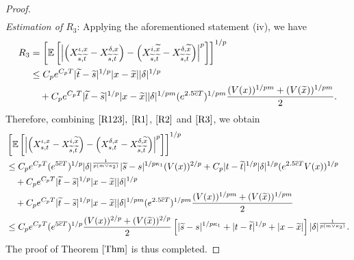 \documentclass[11pt]{article}
\theoremstyle{theorem}
\theoremstyle{definition}
\newcommand{\1}{{\bf 1}}
\begin{document}
\begin{proof}
\begin{align}
\label{R2}
\end{align}
{\it Estimation of $R_3$}: Applying the aforementioned statement (iv), we have
\begin{align}
R_3 & = \left[\mathbb{E}\left[\left| \left(X^{\iota, x}_{\widetilde{s},\widetilde{t}}-X^{\delta, x}_{\widetilde{s},\widetilde{t}}\right) - \left(X^{i, \widetilde{x}}_{\widetilde{s},\widetilde{t}}-X^{\delta, \widetilde{x}}_{\widetilde{s},\widetilde{t}}\right) \right| ^p\right]\right]^{1/p} \notag\\
& \leq C_p e^{C_p T} |\widetilde{t} -\widetilde{s}|^{1/p}|x-\widetilde{x}| |\delta|^{1/p} \notag\\
& \quad + C_p e^{C_p T} |\widetilde{t}-\widetilde{s}|^{1/p}|x-\widetilde{x}|  |\delta|^{1/pm} (e^{2.5 \overline{c}T})^{1/pm}         \frac{(V(x))^{1/pm}+(V(\widetilde{x}))^{1/pm}}{2}. 
\label{R3}
\end{align}
Therefore, combining $\eqref{R123},$ $\eqref{R1}$, $\eqref{R2}$ and $\eqref{R3}$, we obtain  
\begin{align*}
&\left[\mathbb{E}\left[\left|\left(X^{\iota, x}_{s,t}-X^{i,\widetilde{x}}_{\widetilde{s},\widetilde{t}}\right) - \left(X^{\delta, x}_{s,t}-X^{\delta, \widetilde{x}}_{\widetilde{s},\widetilde{t}}\right)\right|^p\right]\right]^{1/p} \notag\\
& \leq C_p e^{C_p T}  (e^{5\overline{c}T})^{1/p}|\delta|^{\frac{1}{p(m \vee \kappa_2)}} |\widetilde{s}-s |^{1/p\kappa_1}  (V(x))^{2/p} + C_p |t-\widetilde{t}|^{1/p} |\delta|^{1/p} (e^{2.5\overline{c}T}V(x))^{1/p} \notag\\
&\quad + C_p e^{C_p T} |\widetilde{t} -\widetilde{s}|^{1/p}|x-\widetilde{x}| |\delta|^{1/p}  \notag\\
& \quad + C_p e^{C_p T} |\widetilde{t}-\widetilde{s}|^{1/p}|x-\widetilde{x}|  |\delta|^{1/pm} (e^{2.5 \overline{c}T})^{1/pm}         \frac{(V(x))^{1/pm}+(V(\widetilde{x}))^{1/pm}}{2} \notag\\
 & \leq C_p e^{C_p T}   (e^{5 \overline{c}T})^{1/p}         \frac{(V(x))^{2/p}+(V(\widetilde{x}))^{2/p}}{2} \left[  |\widetilde{s}-s|^{1/p\kappa_1} + |t-\widetilde{t}|^{1/p} +|x-\widetilde{x}| \right]   |\delta|^{\frac{1}{p(m \vee \kappa_2)}}. 
\end{align*}
The proof of Theorem $\ref{Thm}$ is thus completed.
\end{proof}
\end{document}
